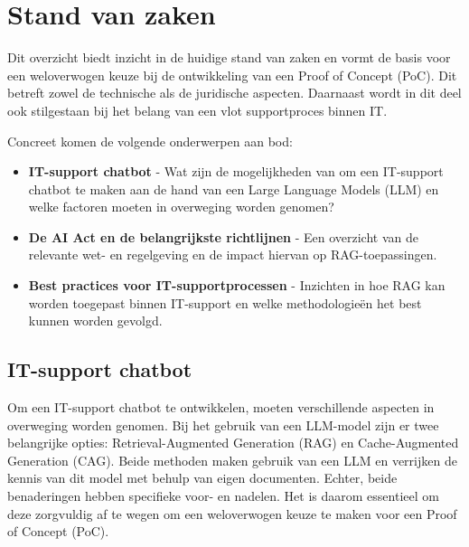 \chapter{Stand van zaken}
\label{ch:stand-van-zaken}


Dit overzicht biedt inzicht in de huidige stand van zaken en vormt de basis voor een weloverwogen keuze bij de ontwikkeling van een Proof of Concept (PoC). Dit betreft zowel de technische als de juridische aspecten. Daarnaast wordt in dit deel ook stilgestaan bij het belang van een vlot supportproces binnen IT.

Concreet komen de volgende onderwerpen aan bod:
\begin{itemize}
    \item \textbf{IT-support chatbot} - Wat zijn de mogelijkheden van om een IT-support chatbot te maken aan de hand van een {Large Language Models} (LLM) en welke factoren moeten in overweging worden genomen?
    \item \textbf{De AI Act en de belangrijkste richtlijnen} - Een overzicht van de relevante wet- en regelgeving en de impact hiervan op RAG-toepassingen.
    \item \textbf{Best practices voor IT-supportprocessen} - Inzichten in hoe RAG kan worden toegepast binnen IT-support en welke methodologieën het best kunnen worden gevolgd.
\end{itemize}

\section{IT-support chatbot}

Om een IT-support chatbot te ontwikkelen, moeten verschillende aspecten in overweging worden genomen. Bij het gebruik van een LLM-model zijn er twee belangrijke opties: Retrieval-Augmented Generation (RAG) en Cache-Augmented Generation (CAG). Beide methoden maken gebruik van een LLM en verrijken de kennis van dit model met behulp van eigen documenten. Echter, beide benaderingen hebben specifieke voor- en nadelen. Het is daarom essentieel om deze zorgvuldig af te wegen om een weloverwogen keuze te maken voor een Proof of Concept (PoC).

